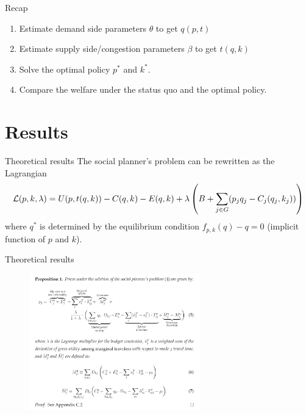 \documentclass[10pt, aspectratio=169]{beamer}
\begin{document}
\begin{frame}{Recap}
  \begin{enumerate}
    \item Estimate demand side parameters $\theta$ to get $q(p,t)$
    \item Estimate supply side/congestion parameters $\beta$ to get $t(q,k)$
    \item Solve the optimal policy $p^*$ and $k^*$.
    \item Compare the welfare under the status quo and the optimal policy.
  \end{enumerate}
\end{frame}
\section{Results}
\begin{frame}{Theoretical results}
  The social planner's problem can be rewritten as the Lagrangian
  \begin{equation*}
    \mathcal{L}(p,k,\lambda)  =U(p,t(q,k))-C(q,k)-E(q,k)+\lambda\left(B+\sum_{j\in G} (p_j q_j - C_j(q_j,k_j))\right)
  \end{equation*}
  where $q^*$ is determined by the equilibrium condition $f_{p,k}(q)-q=0$ (implicit function of $p$ and $k$).
\end{frame}

\begin{frame}{Theoretical results}
  \begin{figure}
    \centering
    \includegraphics[width=0.66\textwidth]{../Figures/proposition1.png}
  \end{figure}
\end{frame}
\end{document}
